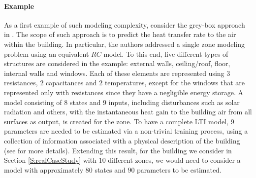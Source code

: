 \paragraph{Example} \textcolor[rgb]{0.00,0.00,1.00}{As a first} example of such modeling complexity, consider the grey-box approach in \cite{Braun2002}. The scope of such approach is to predict the heat transfer rate to the air within the building. In particular, the authors addressed a single zone modeling problem using an equivalent $RC$ model. To this end, five different types of structures are considered in the example: external walls, ceiling/roof, floor, internal walls and windows. Each of these elements are represented using $3$ resistances, $2$ capacitances and $2$ temperatures, except for the windows that are represented only with resistances since they have a negligible energy storage. A model consisting of $8$ states and $9$ inputs, including disturbances such as solar radiation and others, with the instantaneous heat gain to the building air from all surfaces as output, is created for the zone. To have a complete LTI model, $9$ parameters are needed to be estimated via a non-trivial training process, using a collection of information associated with a physical description of the building (see \cite{Braun2002} for more details). Extending this result, for the building we consider in Section \ref{S:realCaseStudy} with $10$ different zones, we would need to consider a model with approximately $80$ states and $90$ parameters to be estimated.

